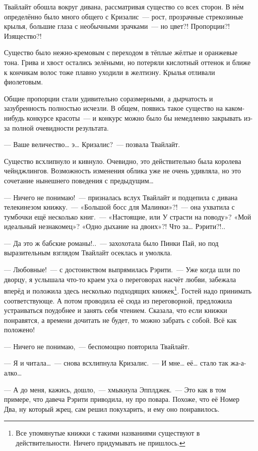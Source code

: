 \documentclass[twoside,a5paper,12pt]{extbook}
\begin{document}
Твайлайт обошла вокруг дивана, рассматривая существо со всех сторон. В нём определённо было много общего с Кризалис — рост, прозрачные стрекозиные крылья, большие глаза с необычными зрачками — но цвет?! Пропорции?! Изящество?!

Существо было нежно-кремовым с переходом в тёплые жёлтые и оранжевые тона. Грива и хвост остались зелёными, но потеряли кислотный оттенок и ближе к кончикам волос тоже плавно уходили в желтизну. Крылья отливали фиолетовым.

Общие пропорции стали удивительно соразмерными, а дырчатость и зазубренность полностью исчезли. В общем, появись такое существо на каком-нибудь конкурсе красоты — и конкурс можно было бы немедленно закрывать из-за полной очевидности результата.

— Ваше величество… э… Кризалис? — позвала Твайлайт.

Существо всхлипнуло и кивнуло. Очевидно, это действительно была королева чейнджлингов. Возможность изменения облика уже не очень удивляла, но это сочетание нынешнего поведения с предыдущим…

— Ничего не понимаю! — призналась вслух Твайлайт и подцепила с дивана телекинезом книжку. — «Большой босс для Малинки»?! — она ухватила с тумбочки ещё несколько книг. — «Настоящие, или У страсти на поводу»? «Мой идеальный незнакомец»? «Одно дыхание на двоих»?! Что за… Рэрити?!..

— Да это ж бабские романы!.. — захохотала было Пинки Пай, но под выразительным взглядом Твайлайт осеклась и умолкла.

— Любовные! — с достоинством выпрямилась Рэрити. — Уже когда шли по дворцу, я услышала что-то краем уха о переговорах насчёт любви, забежала вперёд и положила здесь несколько подходящих книжек\footnote{Все упомянутые книжки с такими названиями существуют в действительности. Ничего придумывать не пришлось.}. Гостей надо принимать соответствующе. А потом проводила её сюда из переговорной, предложила устраиваться поудобнее и занять себя чтением. Сказала, что если книжки понравятся, а времени дочитать не будет, то можно забрать с собой. Всё как положено!

— Ничего не понимаю, — беспомощно повторила Твайлайт.

— Я и читала… — снова всхлипнула Кризалис. — И мне… её… стало так жа-а-алко…

— А до меня, кажись, дошло, — хмыкнула Эпплджек. — Это как в том примере, что давеча Рэрити приводила, ну про повара. Похоже, что её Номер Два, ну который жрец, сам решил покухарить, и ему оно понравилось.
\end{document}
